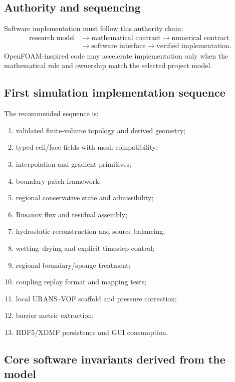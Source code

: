\documentclass[11pt,a4paper]{article}
\begin{document}
\subsection{Authority and sequencing}

Software implementation must follow this authority chain:
\begin{equation}
  \begin{aligned}
  \text{research model}
  &\rightarrow \text{mathematical contract}
  \rightarrow \text{numerical contract}\\
  &\rightarrow \text{software interface}
  \rightarrow \text{verified implementation}.
  \end{aligned}
\end{equation}
OpenFOAM-inspired code may accelerate implementation only when the mathematical role and ownership match the selected project model.

\subsection{First simulation implementation sequence}

The recommended sequence is:
\begin{enumerate}
  \item validated finite-volume topology and derived geometry;
  \item typed cell/face fields with mesh compatibility;
  \item interpolation and gradient primitives;
  \item boundary-patch framework;
  \item regional conservative state and admissibility;
  \item Rusanov flux and residual assembly;
  \item hydrostatic reconstruction and source balancing;
  \item wetting--drying and explicit timestep control;
  \item regional boundary/sponge treatment;
  \item coupling replay format and mapping tests;
  \item local URANS--VOF scaffold and pressure correction;
  \item barrier metric extraction;
  \item HDF5/XDMF persistence and GUI consumption.
\end{enumerate}

\subsection{Core software invariants derived from the model}
\end{document}

